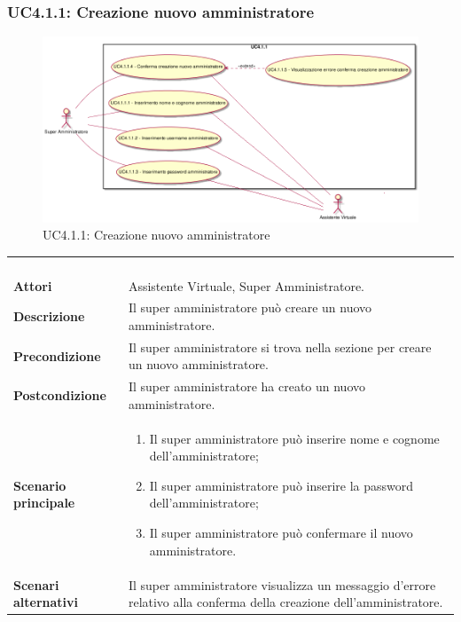 \newpage\subsubsection{UC4.1.1: Creazione nuovo amministratore}
\label{UC4.1.1}
\begin{figure}[h]
	\centering
	\includegraphics[width=\textwidth,height=\textheight,keepaspectratio]{images/UseCaseUC411.png}
	\caption{UC4.1.1: Creazione nuovo amministratore}
\end{figure}
\begin{longtable}{l|p{10cm}}
	\rowcolor[gray]{0.8} \multicolumn{2}{c}{} \\
	\rowcolor[gray]{0.8} \multicolumn{2}{c}{\textbf{UC4.1.1 - Creazione nuovo amministratore}} \\
	\rowcolor[gray]{0.8} \multicolumn{2}{c}{} \\
	\hline
	&\\
	\textbf{Attori} & Assistente Virtuale, Super Amministratore.\\[7pt]
	\textbf{Descrizione} & Il super amministratore può creare un nuovo amministratore.\\[7pt]
	\textbf{Precondizione} & Il super amministratore si trova nella sezione per creare un nuovo amministratore.\\[7pt]
	\textbf{Postcondizione} & Il super amministratore ha creato un nuovo amministratore.\\[7pt]
	\textbf{Scenario principale} &\begin{enumerate}
		\item  Il super amministratore può inserire nome e cognome dell'amministratore;
		\item  Il super amministratore può inserire la password dell'amministratore;
		\item  Il super amministratore può confermare il nuovo amministratore.
	\end{enumerate}
	\\[7pt]
	\textbf{Scenari alternativi} & Il super amministratore visualizza un messaggio d'errore relativo alla conferma della creazione dell'amministratore.\\[7pt]\hline
\end{longtable}

